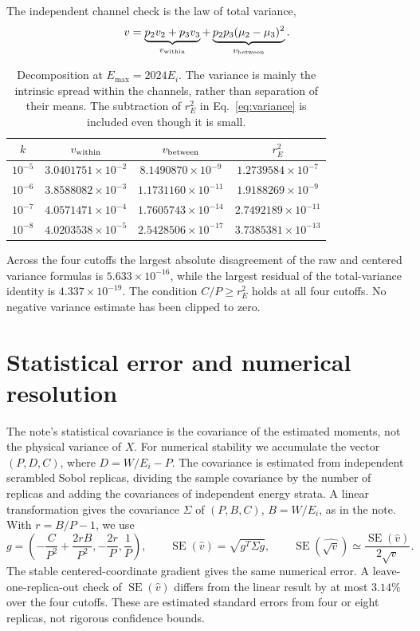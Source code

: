 \documentclass[10pt,a4paper]{article}
\newcommand{\SE}{\operatorname{SE}}
\begin{document}
The independent channel check is the law of total variance,
\begin{equation}
 v=\underbrace{p_2v_2+p_3v_3}_{v_{\rm within}}+
 \underbrace{p_2p_3(\mu_2-\mu_3)^2}_{v_{\rm between}}.
\end{equation}
\begin{table}[h!]
\centering\small
\caption{Decomposition at $E_{\max}=2024E_i$. The variance is mainly
the intrinsic spread within the channels, rather than separation of
their means. The subtraction of $r_E^2$ in Eq.~\eqref{eq:variance} is
included even though it is small.}
\begin{tabular}{cccc}
\toprule
$k$ & $v_{\rm within}$ & $v_{\rm between}$ & $r_E^2$\\
\midrule
$10^{-5}$ & $3.0401751\times10^{-2}$ & $8.1490870\times10^{-9}$ & $1.2739584\times10^{-7}$\\
$10^{-6}$ & $3.8588082\times10^{-3}$ & $1.1731160\times10^{-11}$ & $1.9188269\times10^{-9}$\\
$10^{-7}$ & $4.0571471\times10^{-4}$ & $1.7605743\times10^{-14}$ & $2.7492189\times10^{-11}$\\
$10^{-8}$ & $4.0203538\times10^{-5}$ & $2.5428506\times10^{-17}$ & $3.7385381\times10^{-13}$\\
\bottomrule
\end{tabular}
\end{table}

Across the four cutoffs the largest absolute disagreement of the raw
and centered variance formulas is $5.633\times10^{-16}$, while the largest
residual of the total-variance identity is $4.337\times10^{-19}$.
The condition $C/P\ge r_E^2$ holds at all four cutoffs. No negative
variance estimate has been clipped to zero.

\clearpage
\section{Statistical error and numerical resolution}
The note's statistical covariance is the covariance of the estimated
moments, not the physical variance of $X$. For numerical stability we
accumulate the vector $(P,D,C)$, where $D=W/E_i-P$.
The covariance is estimated from independent scrambled Sobol replicas,
dividing the sample covariance by the number of replicas and adding
the covariances of independent energy strata. A linear transformation
gives the covariance $\Sigma$ of $(P,B,C)$, $B=W/E_i$, as in the note.
With $r=B/P-1$, we use
\[
 g=\left(-\frac{C}{P^2}+\frac{2rB}{P^2},
          -\frac{2r}{P},\frac1P\right),\qquad
 \SE(\widehat v)=\sqrt{g^T\Sigma g},\qquad
 \SE(\widehat{\sqrt v})\simeq\frac{\SE(\widehat v)}{2\sqrt v}.
\]
The stable centered-coordinate gradient gives the same numerical error.
A leave-one-replica-out check of $\SE(\widehat v)$ differs from the
linear result by at most $3.14\%$ over the four cutoffs.
These are estimated standard errors from four or eight replicas, not
rigorous confidence bounds.
\end{document}
